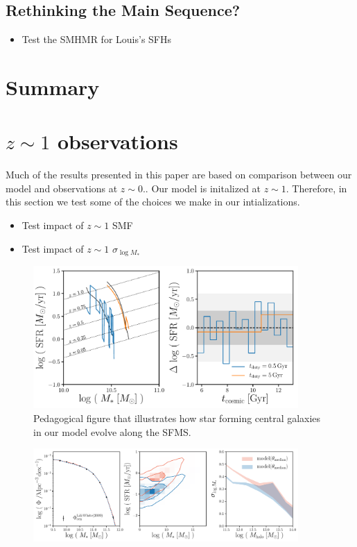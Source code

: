 \documentclass[12pt, letterpaper, preprint]{aastex}
\newcommand{\bitem}{\begin{itemize}}
\newcommand{\eitem}{\end{itemize}}
\begin{document}
\subsection{Rethinking the Main Sequence?}
\bitem 
\item Test the SMHMR for Louis's SFHs 
\eitem 

\section{Summary} \label{sec:summary}


\appendix
\section{$z \sim 1$ observations} \label{app:z1}
Much of the results presented in this paper are based on comparison 
between our model and observations at $z \sim 0.$. Our model is initalized 
at $z \sim 1$. Therefore, in this section we test some of the choices 
we make in our intializations. 

\bitem
\item Test impact of $z \sim 1$ SMF
\item Test impact of $z \sim 1$ $\sigma_{\log M_*}$ 
\eitem

\begin{figure}
\begin{center}
\includegraphics[width=0.9\textwidth]{figs/sfh_pedagogical.pdf}
\caption{Pedagogical figure that illustrates how star forming central galaxies in our model
evolve along the SFMS.}
\label{fig:sfh_model}
\end{center}
\end{figure}

\begin{figure}
\begin{center}
\includegraphics[width=0.9\textwidth]{figs/qaplot_abc.pdf}
\caption{}
\label{fig:abc_demo}
\end{center}
\end{figure}
\end{document}
